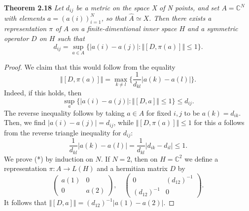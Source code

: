 \textbf{Theorem 2.18} \textit{Let $d_{ij}$ be a metric on the space X of N points, and set $A=\mathbb{C}^N$ with elements $a=(a(i))^N_{i=1}$, so that $\hat{A}\simeq X$. Then there exists a representation $\pi$ of $A$ on a finite-dimentional inner space $H$ and a symmetric operator $D$ on $H$ such that}
\begin{equation}
    d_{ij}=\sup_{a\in A}\{|a(i)-a(j)|:\Vert [D, \pi(a)]\Vert \leq 1\}.
    \label{eqn:metric}
\end{equation}
\begin{proof}
    We claim that this would follow from the equality
    \[
    \Vert[D,\pi(a)]\Vert=\max_{k\neq l}\Bigg\{\frac{1}{d_{kl}}|a(k)-a(l)|\Bigg\}. \tag*{(*)}
    \]
    Indeed,  if this holds, then
    \[
    \sup_a\{|a(i)-a(j)|:\Vert[D,a]\Vert\leq1\}\leq d_{ij}.
    \]
    The reverse inequality follows by taking $a\in A$ for fixed $i, j$ to be $a(k)=d_{ik}$. Then, we find $|a(i)-a(j)|=d_{ij}$, while $\Vert[D,\pi(a)]\Vert\leq1$ for this $a$ follows from the reverse triangle inequality for $d_{ij}$:
    \[
    \frac{1}{d_{kl}}|a(k)-a(l)|=\frac{1}{d_{kl}}|d_{ik}-d_{il}|\leq 1.
    \]
    We prove (*) by induction on $N$. If $N=2$, then on $H=\mathbb{C}^2$ we define a representation $\pi:A\rightarrow L(H)$ and a hermitian matrix $D$ by 
    \[
    \begin{pmatrix}
        a(1) & 0 \\
        0  & a(2)
    \end{pmatrix},\quad
    \begin{pmatrix}
        0 & (d_{12})^{-1}\\
        (d_{12})^{-1} & 0
    \end{pmatrix}.
    \]
    It follows that $\Vert[D,a]\Vert=(d_{12})^{-1}|a(1)-a(2)|$.


\end{proof}
